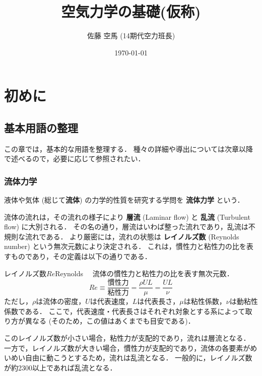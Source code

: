\documentclass[uplatex,dvipdfmx,a4j,11pt]{jsreport}
\newcommand{\keyword}[1]{\textcolor{mainblue}{\textbf{#1}}}
\numberwithin{equation}{chapter}
\begin{document}
\title{\Huge\textbf{空気力学の基礎(仮称)}}
\author{佐藤 空馬 (14期代空力班長)\footnotemark}
\date{\today}
\maketitle

\tableofcontents

\chapter{初めに}
\section{基本用語の整理}
この章では，基本的な用語を整理する．
種々の詳細や導出については次章以降で述べるので，必要に応じて参照されたい．

\subsection{流体力学}
液体や気体 (総じて\keyword{流体}) の力学的性質を研究する学問を \keyword{流体力学} という．

\enskip

流体の流れは，その流れの様子により \keyword{層流} (Laminar flow) と \keyword{乱流} (Turbulent flow) に大別される．
その名の通り，層流はいわば整った流れであり，乱流は不規則な流れである．
より厳密には，流れの状態は \keyword{レイノルズ数} (Reynolds number) という無次元数により決定される．
これは，慣性力と粘性力の比を表すものであり，その定義は以下の通りである．
\begin{definition}{レイノルズ数$\textit{Re}$}{Reynolds}{}
  　流体の慣性力と粘性力の比を表す無次元数．
    \begin{equation}
      \textit{Re} \equiv \frac{\text{慣性力}}{\text{粘性力}}
      = \frac{\rho UL}{\mu} = \frac{UL}{\nu}
    \end{equation}
  ただし，$\rho$は流体の密度，$U$は代表速度，$L$は代表長さ，$\mu$は粘性係数，$\nu$は動粘性係数である．
  ここで，代表速度・代表長さはそれぞれ対象とする系によって取り方が異なる (そのため，この値はあくまでも目安である)．
\end{definition}
このレイノルズ数が小さい場合，粘性力が支配的であり，流れは層流となる．
一方で，レイノルズ数が大きい場合，慣性力が支配的であり，流体の各要素がめいめい自由に動こうとするため，流れは乱流となる．
一般的に，レイノルズ数が約2300以上であれば乱流となる．
\end{document}
